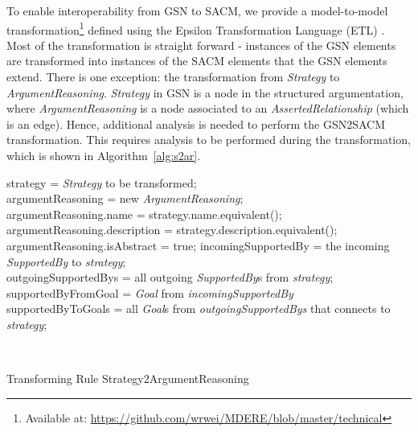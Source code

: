 To enable interoperability from GSN to SACM, we provide a model-to-model transformation\footnote{Available at: \url{https://github.com/wrwei/MDERE/blob/master/technical}} defined using the Epsilon Transformation Language (ETL) \cite{kolovos2008epsilon}. 
Most of the transformation is straight forward - instances of the GSN elements are transformed into instances of the SACM elements that the GSN elements extend. 
There is one exception: the transformation from \textit{Strategy} to \textit{ArgumentReasoning}. 
\textit{Strategy} in GSN is a node in the structured argumentation, where \textit{ArgumentReasoning} is a node associated to an \textit{AssertedRelationship} (which is an edge). Hence, additional analysis is needed to perform the GSN2SACM transformation.
This requires analysis to be performed during the transformation, which is shown in Algorithm~\ref{alg:s2ar}.
\begin{algorithm}[ht!]
	{
		\fontsize{9}{10}
		\selectfont
		\SetAlgoLined\DontPrintSemicolon
		
		
		
		\Let strategy = \textit{Strategy} to be transformed;\\
		\Let argumentReasoning = new \textit{ArgumentReasoning};\\
		
		argumentReasoning.name = strategy.name.equivalent();\\
		argumentReasoning.description = strategy.description.equivalent();\\
		 {
			argumentReasoning.isAbstract = true;
		}
		\Let incomingSupportedBy = the incoming \textit{SupportedBy} to \textit{strategy};\\
		\Let outgoingSupportedBys = all outgoing \textit{SupportedBy}s from \textit{strategy};\\
		\Let supportedByFromGoal = \textit{Goal} from \textit{incomingSupportedBy}\\
		\Let supportedByToGoals = all \textit{Goal}s from \textit{outgoingSupportedBys} that connects to \textit{strategy};\\
	}
	\
	\caption{Transforming Rule Strategy2ArgumentReasoning}
	\label{alg:s2ar}
\end{algorithm}

